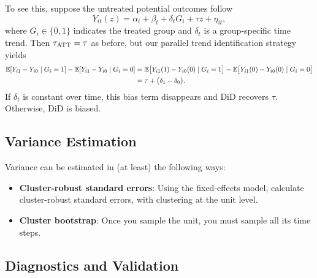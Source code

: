 \documentclass[11pt]{exam}
\begin{document}
To see this, suppose the untreated potential outcomes follow
\[
  Y_{it}(z) = \alpha_i + \beta_t + \delta_t G_i + \tau z + \eta_{it},
\]
where $G_i \in \{0,1\}$ indicates the treated group and $\delta_t$ is a
group-specific time trend. Then $\tau_{\mathrm{ATT}} = \tau$ as before, but our parallel trend identification strategy yields
\begin{align*}
  \mathbb{E}[Y_{i1} - Y_{i0} \mid G_i = 1]
   - \mathbb{E}[Y_{i1} - Y_{i0} \mid G_i = 0] &=\mathbb{E}\bigl[Y_{i1}(1) - Y_{i0}(0) \mid G_i = 1\bigr]
   - \mathbb{E}\bigl[Y_{i1}(0) - Y_{i0}(0) \mid G_i = 0\bigr] \\
   &= \tau + \bigl(\delta_1 - \delta_0\bigr).
\end{align*}
If $\delta_t$ is constant over time, this bias term disappears and DiD recovers $\tau$.
Otherwise, DiD is biased.

\subsection{Variance Estimation}
Variance can be estimated in (at least) the following ways:
\begin{itemize}
    \item \textbf{Cluster-robust standard errors}: Using the fixed-effects model, calculate cluster-robust standard errors, with clustering at the unit level.
    \item \textbf{Cluster bootstrap}: Once you sample the unit, you must sample all its time steps.
\end{itemize}

\subsection{Diagnostics and Validation}
\end{document}
